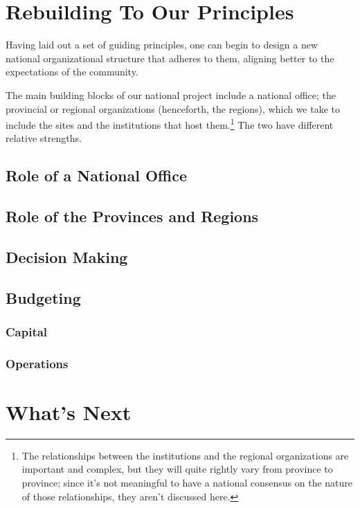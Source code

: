 \documentclass[11pt]{article}
\begin{document}
\section*{Rebuilding To Our Principles}

Having laid out a set of guiding principles, one can begin to design
a new national organizational structure that adheres to them, aligning
better to the expectations of the community.

The main building blocks of our national project include a national
office; the provincial or regional organizations (henceforth, the
regions), which we take to include the sites and the institutions
that host them.\footnote{The relationships between the institutions and
the regional organizations are important and complex, but they will quite
rightly vary from province to province; since it's not meaningful 
to have a national consensus on the nature of those relationships,
they aren't discussed here.}  The two have different relative strengths.


\subsection*{Role of a National Office}

\subsection*{Role of the Provinces and Regions}

\subsection*{Decision Making}

\subsection*{Budgeting}

\subsubsection*{Capital}

\subsubsection*{Operations}

\section*{What's Next}
\end{document}
